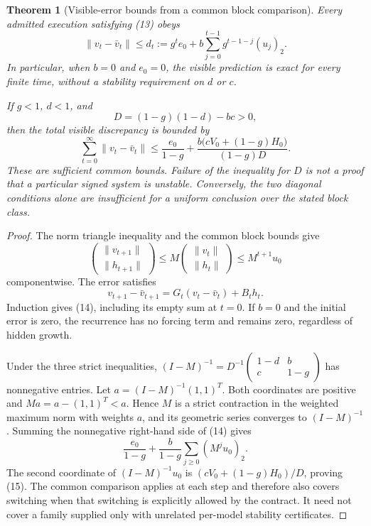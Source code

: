 \documentclass[11pt,letterpaper]{article}
\theoremstyle{plain}
\newtheorem{theorem}{Theorem}[section]
\theoremstyle{definition}
\begin{document}
\begin{theorem}[Visible-error bounds from a common block comparison]\label{thm:blockleakage}
Every admitted execution satisfying (13) obeys
\[
 \|v_t-\bar v_t\|\le d_t
 :=g^te_0+b\sum_{j=0}^{t-1}g^{t-1-j}(u_j)_2. \tag{14}
\]
In particular, when $b=0$ and $e_0=0$, the visible prediction is exact for every finite time, without a stability requirement on $d$ or $c$.

If $g<1$, $d<1$, and
\[
 D=(1-g)(1-d)-bc>0,
\]
then the total visible discrepancy is bounded by
\[
 \sum_{t=0}^{\infty}\|v_t-\bar v_t\|
 \le \frac{e_0}{1-g}
       +\frac{b\bigl(cV_0+(1-g)H_0\bigr)}{(1-g)D}. \tag{15}
\]
These are sufficient common bounds. Failure of the inequality for $D$ is not a proof that a particular signed system is unstable. Conversely, the two diagonal conditions alone are insufficient for a uniform conclusion over the stated block class.
\end{theorem}
\begin{proof}
The norm triangle inequality and the common block bounds give
\[
 \begin{pmatrix}\|v_{t+1}\|\\\|h_{t+1}\|\end{pmatrix}
 \le M\begin{pmatrix}\|v_t\|\\\|h_t\|\end{pmatrix}
 \le M^{t+1}u_0
\]
componentwise. The error satisfies
\[
 v_{t+1}-\bar v_{t+1}=G_t(v_t-\bar v_t)+B_th_t.
\]
Induction gives (14), including its empty sum at $t=0$. If $b=0$ and the initial error is zero, the recurrence has no forcing term and remains zero, regardless of hidden growth.

Under the three strict inequalities, $(I-M)^{-1}=D^{-1}\begin{pmatrix}1-d&b\\c&1-g\end{pmatrix}$ has nonnegative entries. Let $a=(I-M)^{-1}(1,1)^T$. Both coordinates are positive and $Ma=a-(1,1)^T<a$. Hence $M$ is a strict contraction in the weighted maximum norm with weights $a$, and its geometric series converges to $(I-M)^{-1}$. Summing the nonnegative right-hand side of (14) gives
\[
 \frac{e_0}{1-g}+\frac{b}{1-g}\sum_{j\ge0}(M^ju_0)_2.
\]
The second coordinate of $(I-M)^{-1}u_0$ is $(cV_0+(1-g)H_0)/D$, proving (15). The common comparison applies at each step and therefore also covers switching when that switching is explicitly allowed by the contract. It need not cover a family supplied only with unrelated per-model stability certificates.
\end{proof}
\end{document}

